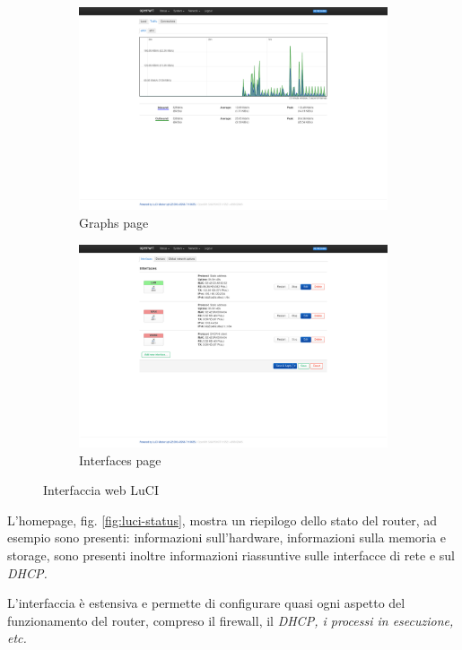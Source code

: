 \begin{figure}[H]
    \begin{subfigure}{0.5\linewidth}
        \centering
        \includegraphics[height=0.65\linewidth]{immagini/LuCI_graphs}
        \caption{Graphs page}
        \label{fig:luci-graphs}
    \end{subfigure}%
    \hfill
    \begin{subfigure}{0.5\linewidth}
        \centering
        \includegraphics[height=0.65\linewidth]{immagini/LuCI_interfaces}
        \caption{Interfaces page}
        \label{fig:luci-interfaces}
    \end{subfigure}%
    \caption{Interfaccia web LuCI}
\end{figure}


L'homepage, fig. \ref{fig:luci-status}, mostra un riepilogo dello stato del router, ad esempio sono presenti: informazioni sull'hardware, informazioni sulla memoria e storage, sono presenti inoltre informazioni riassuntive sulle interfacce di rete e sul \it{DHCP}.

L'interfaccia è estensiva e permette di configurare quasi ogni aspetto del funzionamento del router, compreso il firewall, il \it{DHCP}, i processi in esecuzione, etc. 





